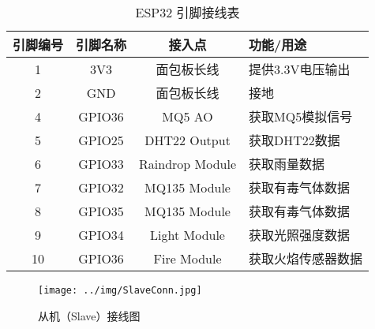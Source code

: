 \begin{table} [H]
    \centering
    \begin{tabular}{|c|c|c|l|}
    \hline
    \textbf{引脚编号} & \textbf{引脚名称} & \textbf{接入点} & \textbf{功能/用途} \\ 
    \hline
    1  & 3V3   & 面包板长线 & 提供3.3V电压输出 \\ 
    2  & GND   & 面包板长线 & 接地 \\ 
    4  & GPIO36  & MQ5 AO  & 获取MQ5模拟信号 \\ 
    5  & GPIO25  & DHT22 Output  & 获取DHT22数据 \\ 
    6  & GPIO33   &  Raindrop Module   & 获取雨量数据 \\
    7  & GPIO32   &  MQ135 Module   & 获取有毒气体数据 \\
    8  & GPIO35   &  MQ135 Module   & 获取有毒气体数据 \\
    9  & GPIO34   &  Light Module   & 获取光照强度数据 \\
    10  & GPIO36   &  Fire Module   & 获取火焰传感器数据 \\
    \hline
    \end{tabular}
    \caption{ESP32 引脚接线表}
\end{table}

\begin{figure} [H]
    \centering
    \texttt{[image: ../img/SlaveConn.jpg]}
    \caption{从机（Slave）接线图}
\end{figure}


